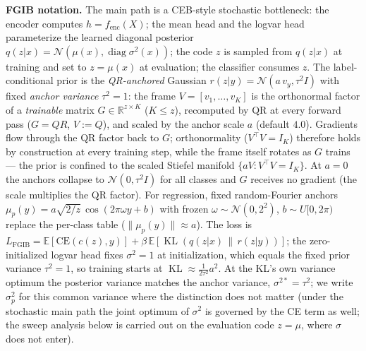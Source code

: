 \textbf{FGIB notation.}
The main path is a CEB-style stochastic bottleneck: the encoder computes
$h = f_{\mathrm{enc}}(X)$; the mean head and the logvar head parameterize the learned
diagonal posterior $q(z|x) = \mathcal{N}(\mu(x), \operatorname{diag}\sigma^2(x))$; the code $z$ is sampled from
$q(z|x)$ at training and set to $z = \mu(x)$ at evaluation; the classifier consumes
$z$. The label-conditional prior is the \emph{QR-anchored} Gaussian
$r(z|y) = \mathcal{N}(a\,v_y, \tau^2 I)$ with fixed \emph{anchor variance}
$\tau^2=1$: the frame $V = [v_1, \dots, v_K]$ is the orthonormal factor of a
\emph{trainable} matrix $G \in \mathbb{R}^{z \times K}$ ($K \le z$), recomputed by
QR at every forward pass ($G = QR$, $V := Q$), and scaled by the anchor scale $a$
(default $4.0$). Gradients flow through the QR factor back to $G$; orthonormality
($V^{\top}V = I_K$) therefore holds by construction at every training step, while the
frame itself rotates as $G$ trains --- the prior is confined to the scaled Stiefel
manifold $\{aV : V^{\top}V = I_K\}$. At $a = 0$ the anchors collapse to
$\mathcal{N}(0, \tau^2 I)$ for all classes and $G$ receives no gradient (the scale
multiplies the QR factor). For regression, fixed random-Fourier anchors
$\mu_p(y) = a\sqrt{2/z}\,\cos(2\pi\omega y + b)$ with frozen
$\omega \sim \mathcal{N}(0, 2^2)$, $b \sim U[0, 2\pi)$ replace the per-class table
($\|\mu_p(y)\| \approx a$). The loss is
$L_{\mathrm{FGIB}} = \mathbb{E}[\mathrm{CE}(c(z), y)]
+ \beta\,\mathbb{E}[\operatorname{KL}(q(z|x)\,\|\,r(z|y))]$; the zero-initialized
logvar head fixes $\sigma^2 = 1$ at initialization, which equals the fixed prior
variance $\tau^2 = 1$, so training starts at
$\operatorname{KL} \approx \tfrac{1}{2\tau^2} a^2$. At the KL's own variance optimum
the posterior variance matches the anchor variance, $\sigma^{2*} = \tau^2$; we write
$\sigma_p^2$ for this common variance where the distinction does not matter (under the
stochastic main path the joint optimum of $\sigma^2$ is governed by the CE term as
well; the sweep analysis below is carried out on the evaluation code $z = \mu$, where
$\sigma$ does not enter).

